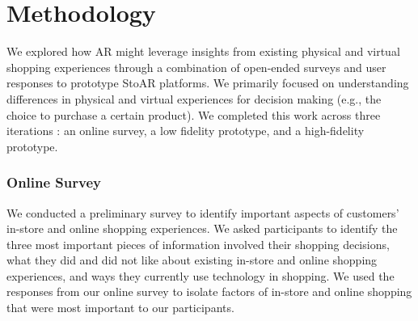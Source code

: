 \section{Methodology}

We explored how AR might leverage insights from existing physical and virtual shopping experiences through a combination of open-ended surveys and user responses to prototype StoAR platforms. We primarily focused on understanding differences in physical and virtual experiences for decision making (e.g., the choice to purchase a certain product). We completed this work across three iterations  : an online survey, a low fidelity prototype, and a high-fidelity prototype.

\subsubsection{Online Survey}
We conducted a preliminary survey to identify important aspects of customers' in-store and online shopping experiences. We asked participants
to identify the three most important pieces of information involved their shopping decisions, what they did and did not like about existing in-store and online shopping experiences, and ways they currently use technology in shopping.   
We used the responses from our online survey to isolate factors of in-store and online shopping that were most important to our participants.   

